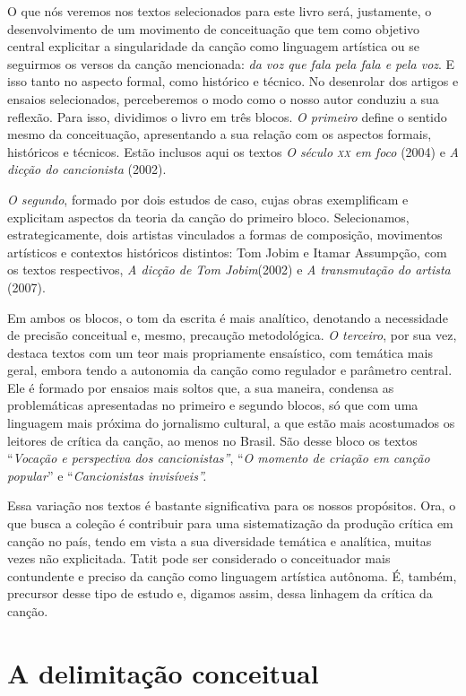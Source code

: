 O que nós veremos nos textos selecionados para este livro será,
justamente, o desenvolvimento de um movimento de conceituação que tem
como objetivo central explicitar a singularidade da canção como
linguagem artística ou se seguirmos os versos da canção mencionada:
\emph{da voz que fala pela fala e pela voz}. E isso tanto no aspecto
formal, como histórico e técnico. No desenrolar dos artigos e ensaios
selecionados, perceberemos o modo como o nosso autor conduziu a sua
reflexão. Para isso, dividimos o livro em três blocos. \emph{O primeiro}
define o sentido mesmo da conceituação, apresentando a sua relação com
os aspectos formais, históricos e técnicos. Estão inclusos aqui os
textos \emph{O século \textsc{xx} em foco} (2004) e \emph{A dicção do
cancionista} (2002).

\emph{O segundo}, formado por dois estudos de caso, cujas obras
exemplificam e explicitam aspectos da teoria da canção do primeiro
bloco. Selecionamos, estrategicamente, dois artistas vinculados a formas
de composição, movimentos artísticos e contextos históricos distintos:
Tom Jobim e Itamar Assumpção, com os textos respectivos, \emph{A dicção
de Tom Jobim}(2002) e \emph{A transmutação do artista} (2007).

Em ambos os blocos, o tom da escrita é mais analítico, denotando a
necessidade de precisão conceitual e, mesmo, precaução metodológica.
\emph{O terceiro}, por sua vez, destaca textos com um teor mais
propriamente ensaístico, com temática mais geral, embora tendo a
autonomia da canção como regulador e parâmetro central. Ele é formado
por ensaios mais soltos que, a sua maneira, condensa as problemáticas
apresentadas no primeiro e segundo blocos, só que com uma linguagem mais
próxima do jornalismo cultural, a que estão mais acostumados os leitores
de crítica da canção, ao menos no Brasil. São desse bloco os textos
``\emph{Vocação e perspectiva dos cancionistas''}, ``\emph{O momento de
criação em canção popular}'' e ``\emph{Cancionistas invisíveis''.}

Essa variação nos textos é bastante significativa para os nossos
propósitos. Ora, o que busca a coleção é contribuir para uma
sistematização da produção crítica em canção no país, tendo em vista a
sua diversidade temática e analítica, muitas vezes não explicitada.
Tatit pode ser considerado o conceituador mais contundente e preciso da
canção como linguagem artística autônoma. É, também, precursor desse
tipo de estudo e, digamos assim, dessa linhagem da crítica da canção.

\section{A delimitação conceitual}

